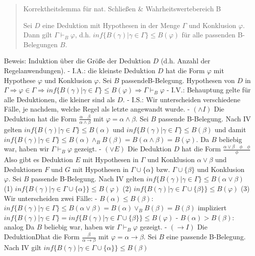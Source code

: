 \documentclass[a4paper]{article}
\begin{document}
\begin{multicols}{3}
  \begin{quote}
    Korrektheitslemma für nat. Schließen \& Wahrheitswertebereich B

    Sei $D$ eine Deduktion mit Hypothesen in der Menge $\Gamma$ und
    Konklusion $\varphi$. Dann gilt $\Gamma\vdash_B \varphi$, d.h.
    $inf\{B(\gamma)|\gamma\in\Gamma\}\leq B(\varphi)$ für alle passenden
    B-Belegungen $B$.
  \end{quote}

  Beweis: Induktion über die Größe der Deduktion $D$ (d.h. Anzahl der
  Regelanwendungen). - I.A.: die kleinste Deduktion $D$ hat die Form
  $\varphi$ mit Hypothese $\varphi$ und Konklusion $\varphi$. Sei $B$
  passendeB-Belegung. Hypothesen von $D$ in
  $\Gamma\Rightarrow\varphi\in\Gamma\Rightarrow inf\{B(\gamma)|\gamma\in\Gamma\}\leq B(\varphi)\Rightarrow\Gamma\vdash_B \varphi$
  - I.V.: Behauptung gelte für alle Deduktionen, die kleiner sind als $D$.
  - I.S.: Wir unterscheiden verschiedene Fälle, je nachdem, welche Regel
  als letzte angewandt wurde. - $(\wedge I)$ Die Deduktion hat die Form
  $\frac{\alpha\quad\beta}{\alpha\wedge\beta}$ mit
  $\varphi=\alpha\wedge\beta$. Sei $B$ passende B-Belegung. Nach IV gelten
  $inf\{B(\gamma)|\gamma\in\Gamma\}\leq B(\alpha)$ und
  $inf\{B(\gamma)|\gamma\in\Gamma\}\leq B(\beta)$ und damit
  $inf\{B(\gamma)|\gamma\in\Gamma\}\leq B(\alpha)\wedge_B B(\beta)=B(\alpha\wedge\beta) =B(\varphi)$.
  Da $B$ beliebig war, haben wir $\Gamma\vdash_B \varphi$ gezeigt. -
  $(\vee E)$ Die Deduktion $D$ hat die Form
  $\frac{\alpha\vee\beta\quad\phi\quad\phi}{\phi}$ Also gibt es Deduktion
  $E$ mit Hypothesen in $\Gamma$ und Konklusion $\alpha\vee\beta$ und
  Deduktionen $F$ und $G$ mit Hypothesen in $\Gamma\cup\{\alpha\}$ bzw.
  $\Gamma\cup\{\beta\}$ und Konklusion $\varphi$. Sei $B$ passende
  B-Belegung. Nach IV gelten
  $inf\{B(\gamma)|\gamma\in\Gamma\}\leq B(\alpha\vee\beta)$ (1)
  $inf\{B(\gamma)|\gamma\in\Gamma\cup\{\alpha\}\}\leq B(\varphi)$ (2)
  $inf\{B(\gamma)|\gamma\in\Gamma\cup\{\beta\}\}\leq B(\varphi)$ (3) Wir
  unterscheiden zwei Fälle: - $B(\alpha)\leq B(\beta)$:
  $inf\{B(\gamma)|\gamma\in\Gamma\}\leq B(\alpha\vee\beta) =B(\alpha)\vee_B B(\beta) =B(\beta)$
  impliziert
  $inf\{B(\gamma)|\gamma\in\Gamma\}= inf\{B(\gamma)|\gamma\in\Gamma\cup\{\beta\}\}\leq B(\varphi)$
  - $B(\alpha)>B(\beta)$: analog Da $B$ beliebig war, haben wir
  $\Gamma\vdash_B \varphi$ gezeigt. - $(\rightarrow I)$ Die DeduktionDhat
  die Form $\frac{\beta}{\alpha\rightarrow\beta}$ mit
  $\varphi=\alpha\rightarrow\beta$. Sei $B$ eine passende B-Belegung. Nach
  IV gilt $inf\{B(\gamma)|\gamma\in\Gamma\cup\{\alpha\}\}\leq B(\beta)$

\end{multicols}
\end{document}
